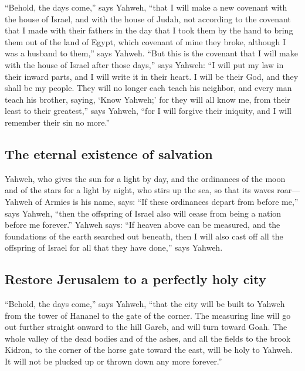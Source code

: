  ``Behold, the days come,'' says Yahweh, ``that I will
make a new covenant with the house of Israel, and with the house of
Judah,  not according to the covenant that I made with
their fathers in the day that I took them by the hand to bring them out
of the land of Egypt, which covenant of mine they broke, although I was
a husband to them,'' says Yahweh.  ``But this is the
covenant that I will make with the house of Israel after those days,''
says Yahweh: ``I will put my law in their inward parts, and I will write
it in their heart. I will be their God, and they shall be my people.
 They will no longer each teach his neighbor, and every
man teach his brother, saying, `Know Yahweh;' for they will all know me,
from their least to their greatest,'' says Yahweh, ``for I will forgive
their iniquity, and I will remember their sin no more.''

\hypertarget{the-eternal-existence-of-salvation}{%
\subsection{The eternal existence of
salvation}\label{the-eternal-existence-of-salvation}}

 Yahweh, who gives the sun for a light by day, and the
ordinances of the moon and of the stars for a light by night, who stirs
up the sea, so that its waves roar--- Yahweh of Armies is his name,
says:  ``If these ordinances depart from before me,''
says Yahweh, ``then the offspring of Israel also will cease from being a
nation before me forever.''  Yahweh says: ``If heaven
above can be measured, and the foundations of the earth searched out
beneath, then I will also cast off all the offspring of Israel for all
that they have done,'' says Yahweh.

\hypertarget{restore-jerusalem-to-a-perfectly-holy-city}{%
\subsection{Restore Jerusalem to a perfectly holy
city}\label{restore-jerusalem-to-a-perfectly-holy-city}}

 ``Behold, the days come,'' says Yahweh, ``that the city
will be built to Yahweh from the tower of Hananel to the gate of the
corner.  The measuring line will go out further straight
onward to the hill Gareb, and will turn toward Goah.  The
whole valley of the dead bodies and of the ashes, and all the fields to
the brook Kidron, to the corner of the horse gate toward the east, will
be holy to Yahweh. It will not be plucked up or thrown down any more
forever.''

